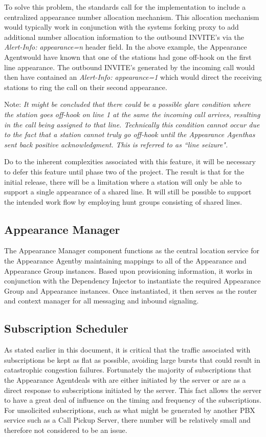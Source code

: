 \documentclass[twoside,11pt]{article}
\newcommand{\PAA}{Appearance Agent\space}
\begin{document}
To solve this problem, the standards call for the implementation to include a centralized appearance
number allocation mechanism.  This allocation mechanism would typically work in conjunction with the
systems forking proxy to add additional number allocation information to the outbound INVITE's via
the \emph{Alert-Info: appearance=n} header field.  In the above example, the \PAA would have known
that one of the stations had gone off-hook on the first line appearance.  The outbound INVITE's
generated by the incoming call would then have contained an \emph{Alert-Info: appearance=1} which
would direct the receiving stations to ring the call on their second appearance.

Note: \emph{It might be concluded that there could be a possible glare condition where the station
goes off-hook on line 1 at the same the incoming call arrives, resulting in the call being assigned
to that line.  Technically this condition cannot occur due to the fact that a station cannot truly
go off-hook until the \PAA has sent back positive acknowledgment.  This is referred to as ``line
seizure".}

Do to the inherent complexities associated with this feature, it will be necessary to defer this
feature until phase two of the project.  The result is that for the initial release, there will be a
limitation where a station will only be able to support a single appearance of a shared line.  It
will still be possible to support the intended work flow by employing hunt groups consisting of
shared lines.

\subsection{Appearance Manager}
The Appearance Manager component functions as the central location service for the \PAA by
maintaining mappings to all of the Appearance and Appearance Group instances.  Based upon
provisioning information, it works in conjunction with the Dependency Injector to instantiate the
required Appearance Group and Appearance instances.  Once instantiated, it then serves as the router
and context manager for all messaging and inbound signaling.

\subsection{Subscription Scheduler}
As stated earlier in this document, it is critical that the traffic associated with subscriptions be
kept as flat as possible, avoiding large bursts that could result in catastrophic congestion
failures.  Fortunately the majority of subscriptions that the \PAA deals with are either initiated
by the server or are as a direct response to subscriptions initiated by the server.  This fact
allows the server to have a great deal of influence on the timing and frequency of the
subscriptions.  For unsolicited subscriptions, such as what might be generated by another PBX
service such as a Call Pickup Server, there number will be relatively small and therefore not
considered to be an issue.
\end{document}
